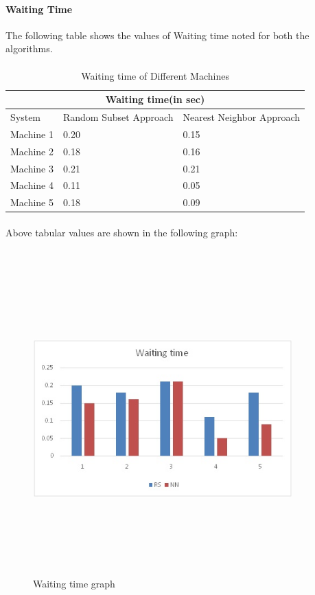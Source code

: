 \documentclass[12pt]{article}
\begin{document}
\paragraph{Waiting Time}
The following table shows the values of Waiting time noted for both the algorithms.
\paragraph{}
\begin{table}[h!]
\centering
 \begin{tabular}
{ |p{4cm}|p{4cm}|p{4cm}|  }
 \hline
 \multicolumn{3}{|c|}{Waiting time(in sec)} \\
 \hline
 System & Random Subset Approach & Nearest Neighbor Approach\\
 \hline
 Machine 1 & 0.20 & 0.15\\
 Machine 2 & 0.18 & 0.16\\
 Machine 3 & 0.21 & 0.21\\
 Machine 4 & 0.11 & 0.05\\
 Machine 5 & 0.18 & 0.09\\
  \hline
\end{tabular}
\paragraph{}
\centering
    \caption{Waiting time of Different Machines}
\end{table}
\clearpage
\paragraph{}
Above tabular values are shown in the following graph:
\\
\\
\begin{figure}[h!]
  \centering
    \includegraphics[width=10cm, height=12cm]{fig_5.jpg}
    \centering
    \caption{Waiting time graph }
\end{figure}
\end{document}
